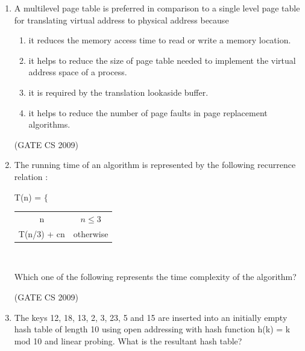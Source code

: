 \documentclass[a4paper, 11pt]{article}
\begin{document}
\begin{enumerate}
    \item A multilevel page table is preferred in comparison to a single level page table for translating virtual address to physical address because
    \begin{enumerate} 
        \item  it reduces the memory access time to read or write a memory location.
        \item it helps to reduce the size of page table needed to implement the virtual address space of a process. 
        \item it is required by the translation lookaside buffer.
        \item it helps to reduce the number of page faults in page replacement algorithms.
    \end{enumerate}

    \hfill (GATE CS 2009)

    \item The running time of an algorithm is represented by the following recurrence relation :\\
    
    \begin{center}
        T(n) = $\Biggl\{$
        \begin{tabular}{cc}
        n & $n \leq3$\\
        T(n/3) + cn & otherwise
    \end{tabular}\\
    \end{center}

    Which one of the following represents the time complexity of the algorithm?\\
    \begin{enumerate}
    \end{enumerate}

    \hfill (GATE CS 2009)

    \item  The keys 12, 18, 13, 2, 3, 23, 5 and 15 are inserted into an initially empty hash table of length 10 using open addressing with hash function h(k) = k mod 10 and linear probing. What is the resultant hash table?\\
    \begin{tabularx}{\textwidth}{@{}XXXX@{}}
        

\end{tabularx}
\end{enumerate}
\end{document}
